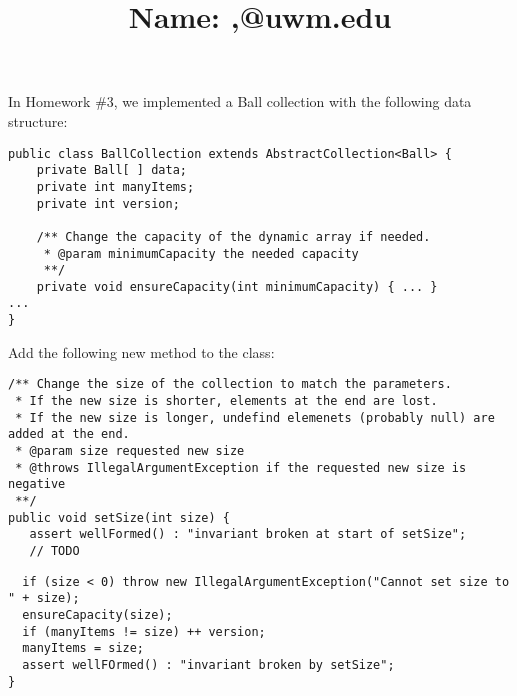 \documentclass[12pt]{article}
\title[Quiz \#4]{Name: \hrulefill\hrulefill,\quad \hrulefill @uwm.edu}
\begin{document}
\maketitle

In Homework \#3, we implemented a Ball collection with the following data structure:
\begin{verbatim}
public class BallCollection extends AbstractCollection<Ball> {
    private Ball[ ] data;
    private int manyItems;
    private int version;
    
    /** Change the capacity of the dynamic array if needed.
     * @param minimumCapacity the needed capacity
     **/
    private void ensureCapacity(int minimumCapacity) { ... }
...
}
\end{verbatim}
Add the following new method to the class:
\begin{verbatim}
/** Change the size of the collection to match the parameters.
 * If the new size is shorter, elements at the end are lost.
 * If the new size is longer, undefind elemenets (probably null) are added at the end.
 * @param size requested new size
 * @throws IllegalArgumentException if the requested new size is negative
 **/
public void setSize(int size) {
   assert wellFormed() : "invariant broken at start of setSize";
   // TODO
\end{verbatim}
\begin{solution}
\begin{verbatim}
  if (size < 0) throw new IllegalArgumentException("Cannot set size to " + size);
  ensureCapacity(size);
  if (manyItems != size) ++ version;
  manyItems = size;
  assert wellFOrmed() : "invariant broken by setSize";
}
\end{verbatim}
\end{solution}

\newpage
\maketitle
\end{document}
